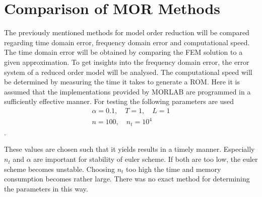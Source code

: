 \chapter{Comparison of MOR Methods} \label{analysis}
The previously mentioned methods for model order reduction will be compared regarding time domain error, frequency domain error and computational speed.
The time domain error will be obtained by comparing the FEM solution to a given approximation.
To get insights into the frequency domain error, the error system of a reduced order model will be analysed.
The computational speed will be determined by measuring the time it takes to generate a ROM.
Here it is assumed that the implementations provided by MORLAB are programmed in a sufficiently effective manner.
For testing the following parameters are used
\begin{gather}
\alpha = 0.1, \quad T = 1, \quad L = 1 \\
n = 100, \quad n_t = 10^{4}
\end{gather}
.

These values are chosen such that it yields results in a timely manner.
Especially \(n_t\) and \(\alpha\) are important for stability of euler scheme.
If both are too low, the euler scheme becomes unstable.
Choosing \(n_t\) too high the time and memory consumption becomes rather large.
There was no exact method for determining the parameters in this way.

